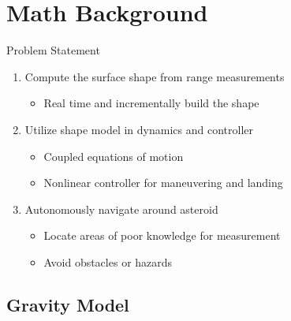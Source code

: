 \documentclass[11pt,professionalfonts]{beamer}
\begin{document}
\section[Problem Statement]{Math Background}
\begin{frame}{Problem Statement}
\begin{enumerate}
    \item<1-> Compute the surface shape from range measurements
        \begin{itemize}
            \item Real time and incrementally build the shape
        \end{itemize}
    \item<2-> Utilize shape model in dynamics and controller
        \begin{itemize}
            \item Coupled equations of motion 
            \item Nonlinear controller for maneuvering and landing
        \end{itemize}
    \item<3-> Autonomously navigate around asteroid 
        \begin{itemize}
            \item Locate areas of poor knowledge for measurement
            \item Avoid obstacles or hazards
        \end{itemize}
\end{enumerate}
\end{frame}

\subsection[Gravity Model]{Gravity Model}
\end{document}
